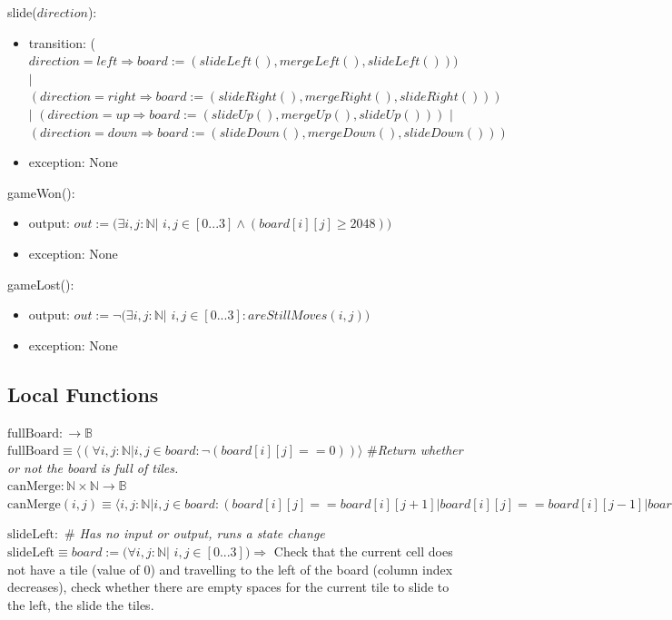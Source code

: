 \documentclass[12pt]{article}
\begin{document}
\noindent slide($direction$):
\begin{itemize}
\item transition: ($direction = left \Rightarrow board := (slideLeft(), mergeLeft(), slideLeft() ) )$ $|$
$(direction = right \Rightarrow board := (slideRight(), mergeRight(), slideRight()))$ $|$
$(direction = up \Rightarrow board := (slideUp(), mergeUp(), slideUp()))$ $|$
$(direction = down \Rightarrow board := (slideDown(), mergeDown(), slideDown()))$
\item exception: None
\end{itemize}

\noindent gameWon():
\begin{itemize}
\item output: $out := (\exists i, j :  \mathbb{N} |$ $i, j \in [0...3] \land (board[i][j] \ge 2048))$
\item exception: None\newline
\end{itemize}

\noindent gameLost():
\begin{itemize}
\item output: $out := \lnot (\exists i, j :  \mathbb{N} |$ $i, j \in [0...3] : areStillMoves(i, j))$
\item exception: None\newline
\end{itemize}

\subsection*{Local Functions}

\noindent $\mbox{fullBoard}: \rightarrow \mathbb{B}$\\
\noindent
$\mbox{fullBoard} \equiv \langle (\forall i, j :  \mathbb{N} | i, j \in board : \lnot (board[i][j] ==0) )\rangle$
\textit{$\#$Return whether or not the board is full of tiles.}
~\\

\noindent $\mbox{canMerge}: \mathbb{N} \times \mathbb{N} \rightarrow \mathbb{B}$\\
\noindent $\mbox{canMerge}(i, j) \equiv \langle i, j :  \mathbb{N} | i, j \in board : (board[i][j] == board[i][j+1] | board[i][j] == board[i][j-1] | board[i][j] == board[i+1][j] | board[i][j] == board[i-1][j])\rangle$ \newline

\noindent $\mbox{slideLeft}:$ \textit{$\#$ Has no input or output, runs a state change}\\
\noindent $\mbox{slideLeft} \equiv board := (\forall i, j :  \mathbb{N} |$ $i, j \in [0...3]) \Rightarrow$  Check that the current cell does not have a tile (value of 0) and travelling to the left of the board (column index decreases), check whether there are empty spaces for the current tile to slide to the left, the slide the tiles. \newline
\end{document}
